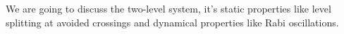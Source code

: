 We are going to discuss the two-level system, it's static properties like level splitting at avoided crossings and dynamical properties like Rabi oscillations.